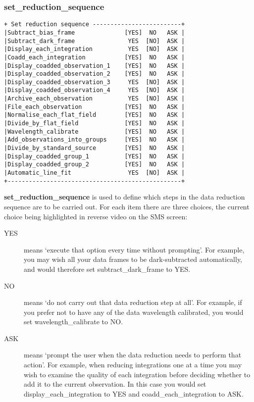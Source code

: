 {\subsubsection{set\_reduction\_sequence}
\label{set_reduction_sequence}
\begin{verbatim}
+ Set reduction sequence -------------------------+
|Subtract_bias_frame              [YES]  NO   ASK |
|Subtract_dark_frame               YES  [NO]  ASK |
|Display_each_integration          YES  [NO]  ASK |
|Coadd_each_integration           [YES]  NO   ASK |
|Display_coadded_observation_1    [YES]  NO   ASK |
|Display_coadded_observation_2    [YES]  NO   ASK |
|Display_coadded_observation_3     YES  [NO]  ASK |
|Display_coadded_observation_4     YES  [NO]  ASK |
|Archive_each_observation          YES  [NO]  ASK |
|File_each_observation            [YES]  NO   ASK |
|Normalise_each_flat_field        [YES]  NO   ASK |
|Divide_by_flat_field             [YES]  NO   ASK |
|Wavelength_calibrate             [YES]  NO   ASK |
|Add_observations_into_groups     [YES]  NO   ASK |
|Divide_by_standard_source        [YES]  NO   ASK |
|Display_coadded_group_1          [YES]  NO   ASK |
|Display_coadded_group_2          [YES]  NO   ASK |
|Automatic_line_fit                YES  [NO]  ASK |
+-------------------------------------------------+
\end{verbatim}

{\bf set\_reduction\_sequence} is used to define which steps in the 
data reduction sequence are to be carried out. For each item there are 
three choices, the current choice being highlighted in reverse video on 
the SMS screen:

\begin{description}
\item[{\sf YES}] means `execute that option every time without prompting'.
  For example, you may wish all your data frames to be dark-subtracted
  automatically, and would therefore set {\sf subtract\_dark\_frame} to 
  {\sf YES}.
\item[{\sf NO}] means `do not carry out that data reduction step at all'.
  For example, if you prefer not to have any of the data wavelength 
  calibrated, you would set {\sf wavelength\_calibrate} to {\sf NO}.
\item[{\sf ASK}] means `prompt the user when the data reduction needs to 
  perform that action'. For example, when reducing integrations one at a 
  time you may wish to examine the quality of each integration before 
  deciding whether to add it to the current observation. In this case you 
  would set {\sf display\_each\_integration} to {\sf YES} and 
  {\sf coadd\_each\_integration} to {\sf ASK}.
\end{description}

}
